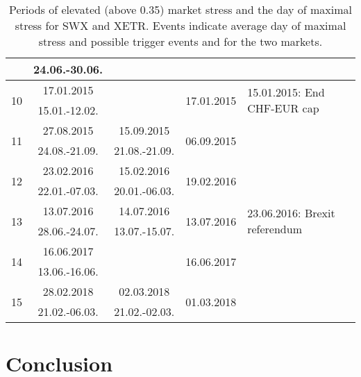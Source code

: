 \documentclass[11pt,twoside,a4paper]{article}
\numberwithin{equation}{section}
\begin{document}
\begin{table}
\begin{tabular}{c|c|c|c|l}
							 & 24.06.-30.06.	& & &\\
\hline
\multirow{2}{*}{10} & 17.01.2015 		& & \multirow{2}{*}{17.01.2015} & \multirow{2}{0.33\linewidth}{15.01.2015: End CHF-EUR cap}\\
							 & 15.01.-12.02.	& & &\\
\hline
\multirow{2}{*}{11} & 27.08.2015 		& 15.09.2015     & \multirow{2}{*}{06.09.2015} & \multirow{2}{0.33\linewidth}{}\\
							 & 24.08.-21.09.	& 21.08.-21.09. & &\\
\hline
\multirow{2}{*}{12} & 23.02.2016 		& 15.02.2016     & \multirow{2}{*}{19.02.2016} & \multirow{2}{0.33\linewidth}{}\\
							 & 22.01.-07.03.	& 20.01.-06.03. & &\\
\hline
\multirow{2}{*}{13} & 13.07.2016 		& 14.07.2016     & \multirow{2}{*}{13.07.2016} & \multirow{2}{0.33\linewidth}{23.06.2016: Brexit referendum}\\
							 & 28.06.-24.07.	& 13.07.-15.07. & &\\
\hline
\multirow{2}{*}{14} & 16.06.2017 		& & \multirow{2}{*}{16.06.2017} & \multirow{2}{0.33\linewidth}{}\\
							 & 13.06.-16.06.	& & &\\
\hline
\multirow{2}{*}{15} & 28.02.2018 		& 02.03.2018     & \multirow{2}{*}{01.03.2018} & \multirow{2}{0.33\linewidth}{}\\
							 & 21.02.-06.03.	& 21.02.-02.03. & &\\
\hline
\end{tabular}
\caption{Periods of elevated (above 0.35) market stress and the day of maximal stress for SWX and XETR. Events indicate average day of maximal stress and possible trigger events and  for the two markets.}
\label{tab_marketevents}
\end{table}
\FloatBarrier
\section{Conclusion}

{}

\end{document}
